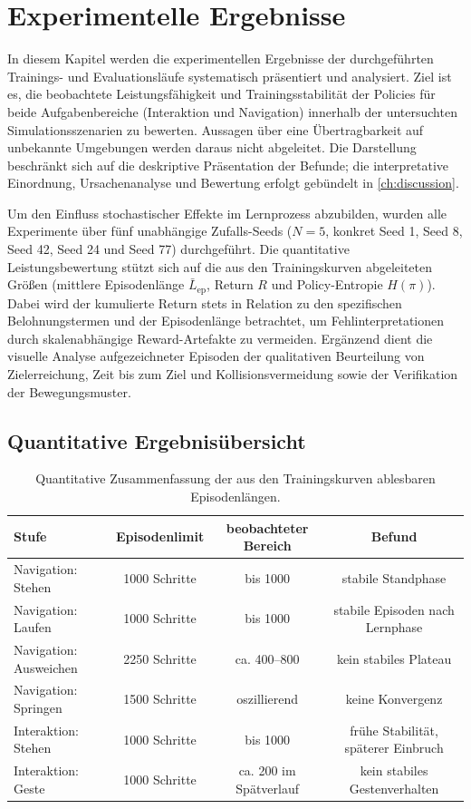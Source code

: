 \chapter{Experimentelle Ergebnisse}\label{ch:results}

In diesem Kapitel werden die experimentellen Ergebnisse der durchgeführten Trainings- und Evaluationsläufe systematisch präsentiert und analysiert. Ziel ist es, die beobachtete Leistungsfähigkeit und Trainingsstabilität der Policies für beide Aufgabenbereiche (Interaktion und Navigation) innerhalb der untersuchten Simulationsszenarien zu bewerten. Aussagen über eine Übertragbarkeit auf unbekannte Umgebungen werden daraus nicht abgeleitet. Die Darstellung beschränkt sich auf die deskriptive Präsentation der Befunde; die interpretative Einordnung, Ursachenanalyse und Bewertung erfolgt gebündelt in \autoref{ch:discussion}.

Um den Einfluss stochastischer Effekte im Lernprozess abzubilden, wurden alle Experimente über fünf unabhängige Zufalls-Seeds ($N = 5$, konkret Seed 1, Seed 8, Seed 42, Seed 24 und Seed 77) durchgeführt. Die quantitative Leistungsbewertung stützt sich auf die aus den Trainingskurven abgeleiteten Größen (mittlere Episodenlänge $\bar{L}_{\text{ep}}$, Return $R$ und Policy-Entropie $H(\pi)$). Dabei wird der kumulierte Return stets in Relation zu den spezifischen Belohnungstermen und der Episodenlänge betrachtet, um Fehlinterpretationen durch skalenabhängige Reward-Artefakte zu vermeiden. Ergänzend dient die visuelle Analyse aufgezeichneter Episoden der qualitativen Beurteilung von Zielerreichung, Zeit bis zum Ziel und Kollisionsvermeidung sowie der Verifikation der Bewegungsmuster.

\section{Quantitative Ergebnisübersicht}

\begin{table}[htbp]
\centering
\small
\begin{tabular}{lccc}
\toprule
\textbf{Stufe} & \textbf{Episodenlimit} & \textbf{beobachteter Bereich} & \textbf{Befund} \\
\midrule
Navigation: Stehen & 1000 Schritte & bis 1000 & stabile Standphase \\
Navigation: Laufen & 1000 Schritte & bis 1000 & stabile Episoden nach Lernphase \\
Navigation: Ausweichen & 2250 Schritte & ca. 400--800 & kein stabiles Plateau \\
Navigation: Springen & 1500 Schritte & oszillierend & keine Konvergenz \\
Interaktion: Stehen & 1000 Schritte & bis 1000 & frühe Stabilität, späterer Einbruch \\
Interaktion: Geste & 1000 Schritte & ca. 200 im Spätverlauf & kein stabiles Gestenverhalten \\
\bottomrule
\end{tabular}
\caption{Quantitative Zusammenfassung der aus den Trainingskurven ablesbaren Episodenlängen.}
\label{tab:quantitative_episode_results}
\end{table}

